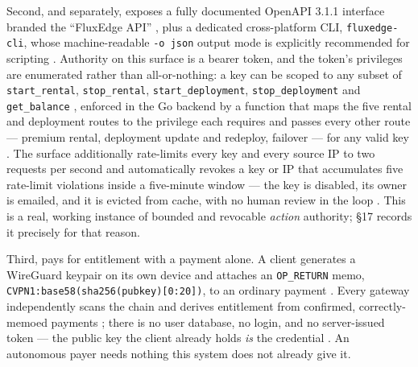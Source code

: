 Second, and separately, \FluxEdge exposes a fully documented OpenAPI 3.1.1 interface branded
the ``FluxEdge API'' \shipped {}, plus a
dedicated cross-platform CLI, \texttt{fluxedge-cli}, whose machine-readable \texttt{-o json}
output mode is explicitly recommended for scripting
. Authority on this surface is a
bearer token, and the token's privileges are enumerated rather than all-or-nothing: a key can be
scoped to any subset of \texttt{start\_rental}, \texttt{stop\_rental}, \texttt{start\_deployment},
\texttt{stop\_deployment} and \texttt{get\_balance}
, enforced in the Go backend by a
function that maps the five rental and deployment routes to the privilege each requires and passes
every other route --- premium rental, deployment update and redeploy, failover --- for any valid key
. The surface additionally rate-limits every
key and every source IP to two requests per second 
and automatically revokes a key or IP that accumulates five rate-limit violations inside a
five-minute window --- the key is disabled, its owner is emailed, and it is evicted from cache,
with no human review in the loop .
This is a real, working instance of bounded and revocable \emph{action} authority; \S17 records
it precisely for that reason.

Third, \CumulusVPN pays for entitlement with a payment alone. A client generates a WireGuard
keypair on its own device and attaches an \texttt{OP\_RETURN} memo,
\texttt{CVPN1:\allowbreak base58(sha256(pubkey)[0{:}20])}, to an ordinary \Flux payment
\shipped {}. Every gateway
independently scans the chain and derives entitlement from confirmed, correctly-memoed payments
; there is no user database, no
login, and no server-issued token --- the public key the client already holds \emph{is} the
credential . An autonomous payer
needs nothing this system does not already give it.


